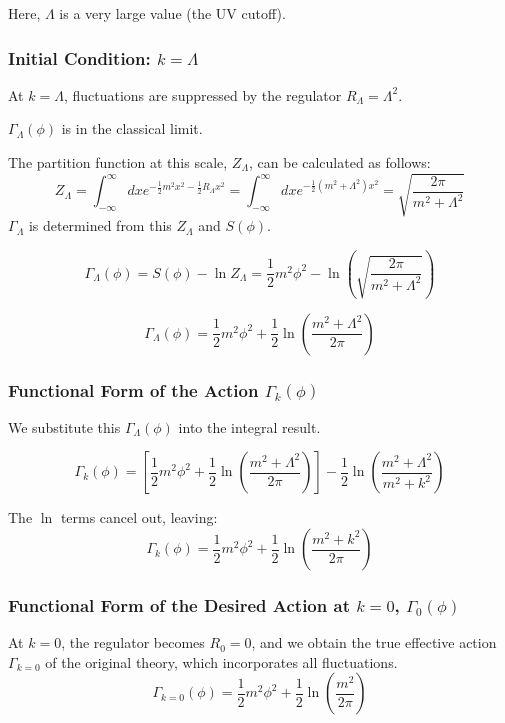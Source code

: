 \documentclass[uplatex,a4j,12pt,dvipdfmx]{jsarticle}
\begin{document}
Here, $\Lambda$ is a very large value (the UV cutoff).

\subsubsection{Initial Condition: $k=\Lambda$}

At $k=\Lambda$, fluctuations are suppressed by the regulator $R_{\Lambda} = \Lambda^{2}$.

$\Gamma_{\Lambda} (\phi)$ is in the classical limit.

The partition function at this scale, $Z_{\Lambda}$, can be calculated as follows:
\[
    Z_{\Lambda} =
    \int^{\infty}_{- \infty} dx e^{ -\frac{1}{2} m^{2} x^{2} - \frac{1}{2} R_{\Lambda} x^{2} }
    =
    \int^{\infty}_{- \infty} dx e^{ -\frac{1}{2} (m^{2} + \Lambda^2) x^{2} }
    =
    \sqrt{ \frac{2 \pi}{m^{2} + \Lambda^2} }
\]
$\Gamma_\Lambda$ is determined from this $Z_\Lambda$ and $S(\phi)$.

\[
    \Gamma_\Lambda(\phi) = S(\phi) - \ln Z_\Lambda = \frac{1}{2}m^2 \phi^2 - \ln \left( \sqrt{\frac{2\pi}{m^2+\Lambda^2}} \right)
\]

\[
    \Gamma_\Lambda(\phi) = \frac{1}{2}m^2 \phi^2 + \frac{1}{2} \ln \left( \frac{m^2+\Lambda^2}{2\pi} \right)
\]

\subsubsection{Functional Form of the Action $\Gamma_{k}(\phi)$}

We substitute this $\Gamma_\Lambda(\phi)$ into the integral result.

\[
    \Gamma_k(\phi) = \left[ \frac{1}{2}m^2 \phi^2 + \frac{1}{2} \ln \left( \frac{m^2+\Lambda^2}{2\pi} \right) \right] - \frac{1}{2} \ln \left( \frac{m^{2} + \Lambda^{2}}{m^{2}+k^{2}} \right)
\]

The $\ln$ terms cancel out, leaving:
\[
    \Gamma_k(\phi) = \frac{1}{2}m^2 \phi^2 + \frac{1}{2} \ln \left( \frac{m^2+k^2}{2\pi} \right)
\]

\subsubsection{Functional Form of the Desired Action at $k=0$, $\Gamma_{0}(\phi)$}

At $k=0$, the regulator becomes $R_0 = 0$,
and we obtain the true effective action $\Gamma_{k=0}$ of the original theory,
which incorporates all fluctuations.
\[
    \Gamma_{k=0}(\phi) = \frac{1}{2}m^2 \phi^2 + \frac{1}{2} \ln \left( \frac{m^2}{2\pi} \right)
\]
\end{document}
